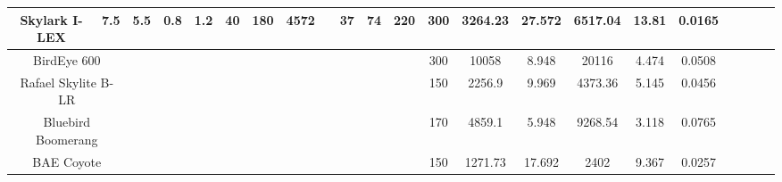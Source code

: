 \documentclass[12 pt]{standalone}
\begin{document}
\begin{tabular}{|cc|c|c|c|c|c|c|c|c|c|c|c|c|c|c|c|c|cc|c|c|}
\multicolumn{1}{|c|}{Skylark   I-LEX} &
  7.5 &
  5.5 &
  0.8 &
  1.2 &
  40 &
  180 &
  4572 &
   &
  37 &
  74 &
  220 &
  300 &
  3264.23 &
  27.572 &
  6517.04 &
  13.81 &
  0.0165 &
  \multicolumn{1}{c|}{} &
   &
   &
   \\ \hline
\multicolumn{2}{|c|}{BirdEye   600} &
   &
   &
   &
   &
   &
   &
   &
   &
   &
   &
  300 &
  10058 &
  8.948 &
  20116 &
  4.474 &
  0.0508 &
  \multicolumn{1}{c|}{} &
   &
   &
   \\ \hline
\multicolumn{2}{|c|}{Rafael   Skylite B-LR} &
   &
   &
   &
   &
   &
   &
   &
   &
   &
   &
  150 &
  2256.9 &
  9.969 &
  4373.36 &
  5.145 &
  0.0456 &
  \multicolumn{1}{c|}{} &
   &
   &
   \\ \hline
\multicolumn{2}{|c|}{Bluebird   Boomerang} &
   &
   &
   &
   &
   &
   &
   &
   &
   &
   &
  170 &
  4859.1 &
  5.948 &
  9268.54 &
  3.118 &
  0.0765 &
  \multicolumn{1}{c|}{} &
   &
   &
   \\ \hline
\multicolumn{2}{|c|}{BAE   Coyote} &
   &
   &
   &
   &
   &
   &
   &
   &
   &
   &
  150 &
  1271.73 &
  17.692 &
  2402 &
  9.367 &
  0.0257 &
  \multicolumn{1}{c|}{} &
   &
   &
   \\ \hline
\end{tabular}%
\end{document}
